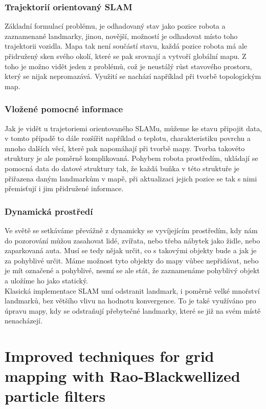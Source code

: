 \documentclass[11pt]{article}
\begin{document}
\subsubsection{Trajektorií orientovaný SLAM}
Základní formulací problému, je odhadovaný stav jako pozice robota a zaznamenané landmarky, jinou, novější, možností je odhadovat místo toho trajektorii vozidla. Mapa tak není součástí stavu, každá pozice robota má ale přidružený sken svého okolí, které se pak srovnají a vytvoří globální mapu. Z toho je možno vidět jeden z problémů, což je neustálý růst stavového prostoru, který se nijak nepromazává. Využití se nachází například při tvorbě topologickým map.
\subsubsection{Vložené pomocné informace}
Jak je vidět u trajetoriemi orientovaného SLAMu, můžeme ke stavu připojit data, v tomto případě to dále rozšířit například o teplotu, charakteristiku povrchu a mnoho dalších věcí, které pak napomáhají při tvorbě mapy. Tvorba takovéto struktury je ale poměrně komplikovaná. Pohybem robota prostředím, ukládají se pomocná data do datové struktury tak, že každá buňka v této struktuře je přiřazena daným landmarkům v mapě, při aktualizaci jejich pozice se tak s nimi přemisťují i jim přidružené informace. 

\subsubsection{Dynamická prostředí}
Ve světě se setkáváme převážně z dynamicky se vyvíjejícím prostředím, kdy nám do pozorování můžou zasahovat lidé, zvířata, nebo třeba nábytek jako židle, nebo zaparkovaná auta. Musí se tedy nějak určit, co s takovými objekty bude a jak je za pohyblivé určit. Máme možnost tyto objekty do mapy vůbec nepřidávat, nebo je mít označené a pohyblivé, nesmí se ale stát, že zaznamenáme pohyblivý objekt a uložíme ho jako statický. \\
\indent Klasická implementace SLAM umí odstranit landmark, i poměrně velké mnořství landmarků, bez většího vlivu na hodnotu konvergence. To je také využíváno pro úpravu mapy, kdy se odstraňují přebytečné landmarky, které se již na svém místě nenacházejí. 



\section{Improved techniques for grid mapping with Rao-Blackwellized particle filters}
\end{document}
